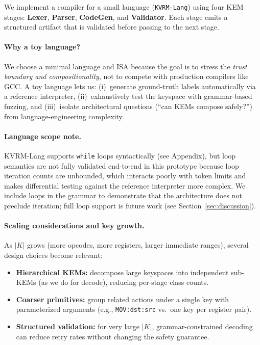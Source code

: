 \documentclass[11pt]{article}
\begin{document}
We implement a compiler for a small language (\texttt{KVRM-Lang}) using four KEM stages:
\textbf{Lexer}, \textbf{Parser}, \textbf{CodeGen}, and \textbf{Validator}.
Each stage emits a structured artifact that is validated before passing to the next stage.

\paragraph{Why a toy language?}
We choose a minimal language and ISA because the goal is to stress the \emph{trust boundary and compositionality}, not to compete with production compilers like GCC.
A toy language lets us:
(i)~generate ground-truth labels automatically via a reference interpreter,
(ii)~exhaustively test the keyspace with grammar-based fuzzing, and
(iii)~isolate architectural questions (``can KEMs compose safely?'') from language-engineering complexity.

\paragraph{Language scope note.}
KVRM-Lang supports \texttt{while} loops syntactically (see Appendix), but loop semantics are not fully validated end-to-end in this prototype because loop iteration counts are unbounded, which interacts poorly with token limits and makes differential testing against the reference interpreter more complex.
We include loops in the grammar to demonstrate that the architecture does not preclude iteration; full loop support is future work (see Section~\ref{sec:discussion}).

\paragraph{Scaling considerations and key growth.}
As $|K|$ grows (more opcodes, more registers, larger immediate ranges), several design choices become relevant:
\begin{itemize}[leftmargin=*]
  \item \textbf{Hierarchical KEMs:} decompose large keyspaces into independent sub-KEMs (as we do for decode), reducing per-stage class counts.
  \item \textbf{Coarser primitives:} group related actions under a single key with parameterized arguments (e.g., \texttt{MOV:dst:src} vs.\ one key per register pair).
  \item \textbf{Structured validation:} for very large $|K|$, grammar-constrained decoding can reduce retry rates without changing the safety guarantee.
\end{itemize}
\end{document}
